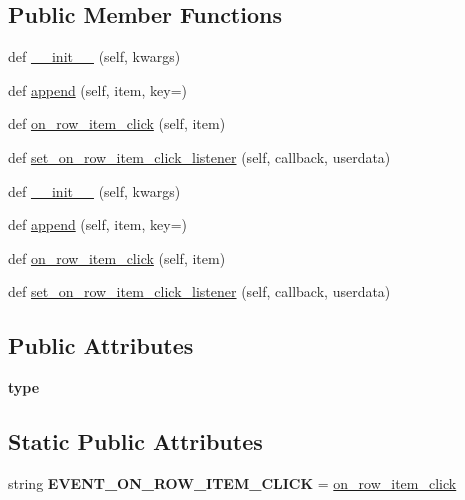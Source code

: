 \subsection*{Public Member Functions}
\begin{DoxyCompactItemize}
\item 
def \hyperlink{classremi_1_1gui_1_1TableRow_ad40ad115f41daa464129e409573b5134}{\+\_\+\+\_\+init\+\_\+\+\_\+} (self, kwargs)
\item 
def \hyperlink{classremi_1_1gui_1_1TableRow_aa2c89d3552c854f7834ed7ec5caa52a0}{append} (self, item, key=\textquotesingle{}\textquotesingle{})
\item 
def \hyperlink{classremi_1_1gui_1_1TableRow_a6aa1d4d720bcef9c7353bf45f4f49654}{on\+\_\+row\+\_\+item\+\_\+click} (self, item)
\item 
def \hyperlink{classremi_1_1gui_1_1TableRow_a6e669389d81a91db96636ca481051bf7}{set\+\_\+on\+\_\+row\+\_\+item\+\_\+click\+\_\+listener} (self, callback, userdata)
\item 
def \hyperlink{classremi_1_1gui_1_1TableRow_ad40ad115f41daa464129e409573b5134}{\+\_\+\+\_\+init\+\_\+\+\_\+} (self, kwargs)
\item 
def \hyperlink{classremi_1_1gui_1_1TableRow_aa2c89d3552c854f7834ed7ec5caa52a0}{append} (self, item, key=\textquotesingle{}\textquotesingle{})
\item 
def \hyperlink{classremi_1_1gui_1_1TableRow_a6aa1d4d720bcef9c7353bf45f4f49654}{on\+\_\+row\+\_\+item\+\_\+click} (self, item)
\item 
def \hyperlink{classremi_1_1gui_1_1TableRow_a6e669389d81a91db96636ca481051bf7}{set\+\_\+on\+\_\+row\+\_\+item\+\_\+click\+\_\+listener} (self, callback, userdata)
\end{DoxyCompactItemize}
\subsection*{Public Attributes}
\begin{DoxyCompactItemize}
\item 
{\bfseries type}\hypertarget{classremi_1_1gui_1_1TableRow_a3c66a09be37958982fff046618cbae6d}{}\label{classremi_1_1gui_1_1TableRow_a3c66a09be37958982fff046618cbae6d}

\end{DoxyCompactItemize}
\subsection*{Static Public Attributes}
\begin{DoxyCompactItemize}
\item 
string {\bfseries E\+V\+E\+N\+T\+\_\+\+O\+N\+\_\+\+R\+O\+W\+\_\+\+I\+T\+E\+M\+\_\+\+C\+L\+I\+CK} = \textquotesingle{}\hyperlink{classremi_1_1gui_1_1TableRow_a6aa1d4d720bcef9c7353bf45f4f49654}{on\+\_\+row\+\_\+item\+\_\+click}\textquotesingle{}\hypertarget{classremi_1_1gui_1_1TableRow_a54149946c7d08b788f0c1a26747a98b2}{}\label{classremi_1_1gui_1_1TableRow_a54149946c7d08b788f0c1a26747a98b2}

\end{DoxyCompactItemize}


